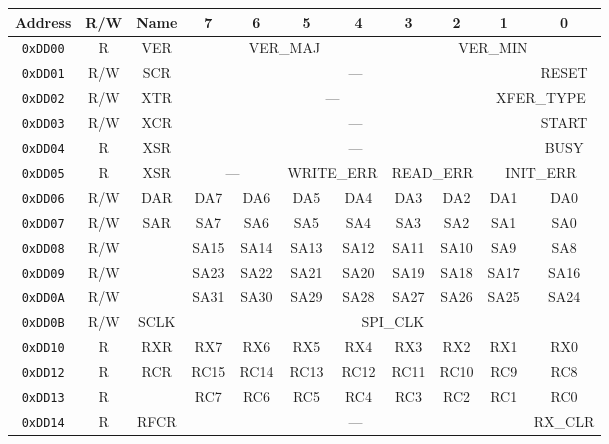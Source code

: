 \begin{table}[h]
    \begin{center}
        \begin{tabular}{|c|c|c|c|c|c|c|c|c|c|c|} \hline
            Address & R/W & Name & 7 & 6 & 5 & 4 & 3 & 2 & 1 & 0 \\\hline\hline
            \verb+0xDD00+ & R & VER & \multicolumn{4}{|c|}{VER\_MAJ} & \multicolumn{4}{|c|}{VER\_MIN} \\ \hline
            \verb+0xDD01+ & R/W & SCR & \multicolumn{7}{|c|}{---} & RESET \\ \hline
            \verb+0xDD02+ & R/W & XTR & \multicolumn{6}{|c|}{---} & \multicolumn{2}{|c|}{XFER\_TYPE} \\ \hline
            \verb+0xDD03+ & R/W & XCR & \multicolumn{7}{|c|}{---} & START \\ \hline
            \verb+0xDD04+ & R & XSR & \multicolumn{7}{|c|}{---} & BUSY \\ \hline
            \verb+0xDD05+ & R & XSR & \multicolumn{2}{|c|}{---} & \multicolumn{2}{|c|}{WRITE\_ERR} & \multicolumn{2}{|c|}{READ\_ERR}
                & \multicolumn{2}{|c|}{INIT\_ERR}\\ \hline
            \verb+0xDD06+ & R/W & DAR & DA7 & DA6 & DA5 & DA4 & DA3 & DA2 & DA1 & DA0 \\ \hline

            \verb+0xDD07+ & R/W & \multirow{4}{*}{SAR} & SA7 & SA6 & SA5 & SA4 & SA3 & SA2 & SA1 & SA0 \\ \cline{1-2}\cline{4-11}
            \verb+0xDD08+ & R/W &  & SA15 & SA14 & SA13 & SA12 & SA11 & SA10 & SA9 & SA8 \\  \cline{1-2}\cline{4-11}
            \verb+0xDD09+ & R/W &  & SA23 & SA22 & SA21 & SA20 & SA19 & SA18 & SA17 & SA16 \\  \cline{1-2}\cline{4-11}
            \verb+0xDD0A+ & R/W &  & SA31 & SA30 & SA29 & SA28 & SA27 & SA26 & SA25 & SA24 \\ \hline

            \verb+0xDD0B+ & R/W & SCLK & \multicolumn{8}{|c|}{SPI\_CLK} \\ \hline

            \verb+0xDD10+ & R & RXR & RX7 & RX6 & RX5 & RX4 & RX3 & RX2 & RX1 & RX0 \\ \hline
            \verb+0xDD12+ & R & \multirow{2}{*}{RCR} & RC15 & RC14 & RC13 & RC12 & RC11 & RC10 & RC9 & RC8 \\  \cline{1-2}\cline{4-11}
            \verb+0xDD13+ & R & & RC7 & RC6 & RC5 & RC4 & RC3 & RC2 & RC1 & RC0 \\ \hline
            \verb+0xDD14+ & R & RFCR & \multicolumn{7}{|c|}{---} & RX\_CLR \\ \hline


\end{tabular}
\end{center}
\end{table}

